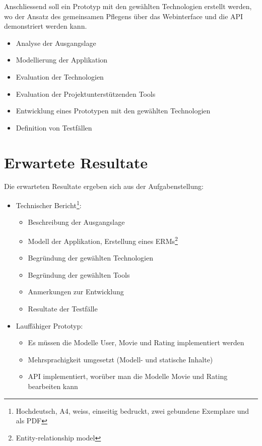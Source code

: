 \documentclass[]{scrreprt}
\begin{document}
    Anschliessend soll ein Prototyp mit den gewählten Technologien erstellt
    werden, wo der Ansatz des gemeinsamen Pflegens über das Webinterface und 
    die API demonstriert werden kann.
    
    \begin{itemize}
        \item Analyse der Ausgangslage
        \item Modellierung der Applikation
        \item Evaluation der Technologien
        \item Evaluation der Projektunterstützenden Tools
        \item Entwicklung eines Prototypen mit den gewählten Technologien
        \item Definition von Testfällen
    \end{itemize}

    \section{Erwartete Resultate}
    Die erwarteten Resultate ergeben sich aus der Aufgabenstellung:
    
    \begin{itemize}
        \item Technischer Bericht\footnote{Hochdeutsch, A4, weiss, einseitig 
            bedruckt, zwei gebundene Exemplare und als PDF}:
        \begin{itemize}
            \item Beschreibung der Ausgangslage
            \item Modell der Applikation, Erstellung eines ERMs\footnote{
                Entity-relationship model}
            \item Begründung der gewählten Technologien
            \item Begründung der gewählten Tools
            \item Anmerkungen zur Entwicklung
            \item Resultate der Testfälle
        \end{itemize}
    	\item Lauffähiger Prototyp:
    	\begin{itemize}
            \item Es müssen die Modelle User, Movie und Rating implementiert
                werden
            \item Mehrsprachigkeit umgesetzt (Modell- und statische 
                Inhalte)
            \item API implementiert, worüber man die Modelle Movie und Rating
                bearbeiten kann
        \end{itemize}
    \end{itemize}
\end{document}
